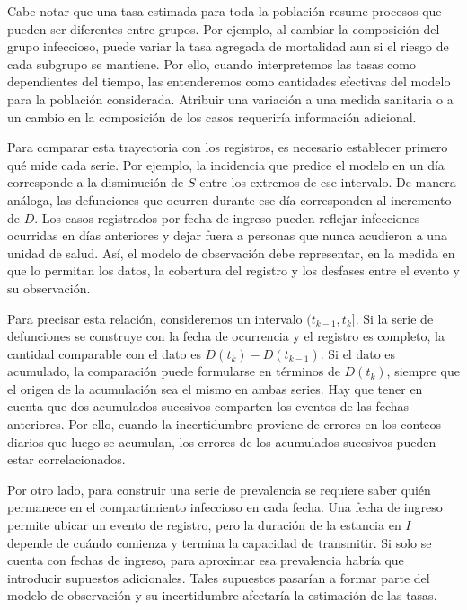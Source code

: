 Cabe notar que una tasa estimada para toda la población resume procesos que pueden ser diferentes entre grupos. Por ejemplo, al cambiar la composición del grupo infeccioso, puede variar la tasa agregada de mortalidad aun si el riesgo de cada subgrupo se mantiene. Por ello, cuando interpretemos las tasas como dependientes del tiempo, las entenderemos como cantidades efectivas del modelo para la población considerada. Atribuir una variación a una medida sanitaria o a un cambio en la composición de los casos requeriría información adicional.

Para comparar esta trayectoria con los registros, es necesario establecer primero qué mide cada serie. Por ejemplo, la incidencia que predice el modelo en un día corresponde a la disminución de $S$ entre los extremos de ese intervalo. De manera análoga, las defunciones que ocurren durante ese día corresponden al incremento de $D$. Los casos registrados por fecha de ingreso pueden reflejar infecciones ocurridas en días anteriores y dejar fuera a personas que nunca acudieron a una unidad de salud. Así, el modelo de observación debe representar, en la medida en que lo permitan los datos, la cobertura del registro y los desfases entre el evento y su observación.

Para precisar esta relación, consideremos un intervalo $(t_{k-1},t_k]$. Si la serie de defunciones se construye con la fecha de ocurrencia y el registro es completo, la cantidad comparable con el dato es $D(t_k)-D(t_{k-1})$. Si el dato es acumulado, la comparación puede formularse en términos de $D(t_k)$, siempre que el origen de la acumulación sea el mismo en ambas series. Hay que tener en cuenta que dos acumulados sucesivos comparten los eventos de las fechas anteriores. Por ello, cuando la incertidumbre proviene de errores en los conteos diarios que luego se acumulan, los errores de los acumulados sucesivos pueden estar correlacionados.

Por otro lado, para construir una serie de prevalencia se requiere saber quién permanece en el compartimiento infeccioso en cada fecha. Una fecha de ingreso permite ubicar un evento de registro, pero la duración de la estancia en $I$ depende de cuándo comienza y termina la capacidad de transmitir. Si solo se cuenta con fechas de ingreso, para aproximar esa prevalencia habría que introducir supuestos adicionales. Tales supuestos pasarían a formar parte del modelo de observación y su incertidumbre afectaría la estimación de las tasas.


